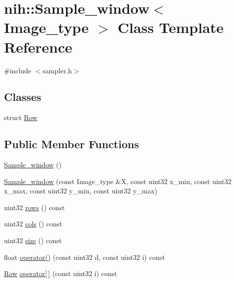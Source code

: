 \hypertarget{classnih_1_1_sample__window}{
\section{nih\-:\-:\-Sample\-\_\-window$<$ \-Image\-\_\-type $>$ \-Class \-Template \-Reference}
\label{classnih_1_1_sample__window}
}


{\ttfamily \#include $<$sampler.\-h$>$}

\subsection*{\-Classes}
\begin{DoxyCompactItemize}
\item 
struct \hyperlink{structnih_1_1_sample__window_1_1_row}{\-Row}
\end{DoxyCompactItemize}
\subsection*{\-Public \-Member \-Functions}
\begin{DoxyCompactItemize}
\item 
\hyperlink{classnih_1_1_sample__window_aa12be238726bcf76f72449060af48667}{\-Sample\-\_\-window} ()
\item 
\hyperlink{classnih_1_1_sample__window_a72a4940dca015579b6ca138529b72df9}{\-Sample\-\_\-window} (const \-Image\-\_\-type \&\-X, const uint32 x\-\_\-min, const uint32 x\-\_\-max, const uint32 y\-\_\-min, const uint32 y\-\_\-max)
\item 
uint32 \hyperlink{classnih_1_1_sample__window_af849b55c2fa39c9e5cb778d3a9a3d532}{rows} () const 
\item 
uint32 \hyperlink{classnih_1_1_sample__window_a007cc41b50f9816fb80af1c09718b571}{cols} () const 
\item 
uint32 \hyperlink{classnih_1_1_sample__window_a4014f7b1128df057a162c1ceee7ef702}{size} () const 
\item 
float \hyperlink{classnih_1_1_sample__window_a24c29fe1b7efccda087cf5c7082b84ba}{operator()} (const uint32 d, const uint32 i) const 
\item 
\hyperlink{structnih_1_1_sample__window_1_1_row}{\-Row} \hyperlink{classnih_1_1_sample__window_a8558d04069ecf2a4f28323a82b1b5cf0}{operator\mbox{[}$\,$\mbox{]}} (const uint32 i) const 
\end{DoxyCompactItemize}


